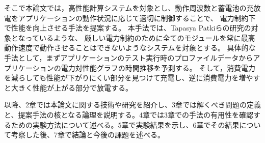 そこで本論文では，高性能計算システムを対象とし、動作周波数と蓄電池の充放電をアプリケーションの動作状況に応じて適切に制御することで、
電力制約下で性能を向上させる手法を提案する。
本手法では、Tapasya Patkiらの研究\cite{Patki:2013:EHO:2464996.2465009}の対象となっているような、
厳しい電力制約のために全てのモジュールを常に最高動作速度で動作させることはできないようなシステムを対象とする。
具体的な手法として，まずアプリケーションのテスト実行時のプロファイルデータからアプリケーションの電力対性能グラフの時間推移を予測する。
そして，消費電力を減らしても性能が下がりにくい部分を見つけて充電し、逆に消費電力を増やすと大きく性能が上がる部分で放電する。


以降、2章では本論文に関する技術や研究を紹介し、3章では解くべき問題の定義と、提案手法の核となる論理を説明する。4章では3章での手法の有用性を確認するための実験方法について述べる。5章で実験結果を示し、6章でその結果について考察した後、7章で結論と今後の課題を述べる。







